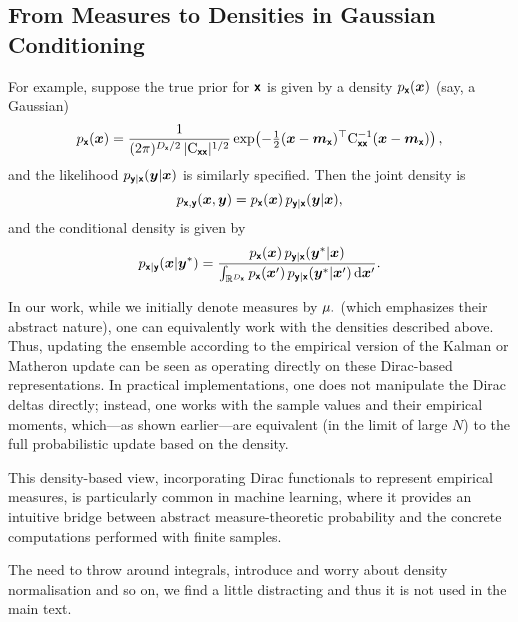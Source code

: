 \documentclass[wcp]{jmlr} %
\begin{document}
\subsection*{From Measures to Densities in Gaussian Conditioning}

For example, suppose the true prior for \(\boldsymbol{\mathsf{x}}\) is given by a density \(p_{\boldsymbol{\mathsf{x}}}(\boldsymbol{x})\) (say, a Gaussian)
\[
    p_{\boldsymbol{\mathsf{x}}}(\boldsymbol{x}) = \frac{1}{(2\pi)^{D_{\boldsymbol{\mathsf{x}}}/2} \,|\mathrm{C}_{\boldsymbol{\mathsf{xx}}}|^{1/2}} \exp\!\left(-\tfrac{1}{2}(\boldsymbol{x}-\boldsymbol{m}_{\boldsymbol{\mathsf{x}}})^\top \mathrm{C}_{\boldsymbol{\mathsf{xx}}}^{-1} (\boldsymbol{x}-\boldsymbol{m}_{\boldsymbol{\mathsf{x}}})\right),
\]
and the likelihood \(p_{\boldsymbol{\mathsf{y}}|\boldsymbol{\mathsf{x}}}(\boldsymbol{y}|\boldsymbol{x})\) is similarly specified. Then the joint density is
\begin{equation}
    p_{\boldsymbol{\mathsf{x}},\boldsymbol{\mathsf{y}}}(\boldsymbol{x},\boldsymbol{y})
    = p_{\boldsymbol{\mathsf{x}}}(\boldsymbol{x})\,p_{\boldsymbol{\mathsf{y}}|\boldsymbol{\mathsf{x}}}(\boldsymbol{y}|\boldsymbol{x}),
\end{equation}
and the conditional density is given by
\begin{equation}
    p_{\boldsymbol{\mathsf{x}}|\boldsymbol{\mathsf{y}}}(\boldsymbol{x}|\boldsymbol{y}^*)
    = \frac{p_{\boldsymbol{\mathsf{x}}}(\boldsymbol{x})\,p_{\boldsymbol{\mathsf{y}}|\boldsymbol{\mathsf{x}}}(\boldsymbol{y}^*|\boldsymbol{x})}{\int_{\mathbb{R}^{D_{\boldsymbol{\mathsf{x}}}}} p_{\boldsymbol{\mathsf{x}}}(\boldsymbol{x}')\,p_{\boldsymbol{\mathsf{y}}|\boldsymbol{\mathsf{x}}}(\boldsymbol{y}^*|\boldsymbol{x}')\,\mathrm{d}\boldsymbol{x}'}.
\end{equation}

In our work, while we initially denote measures by \(\Law[\cdot]\) (which emphasizes their abstract nature), one can equivalently work with the densities described above.
Thus, updating the ensemble according to the empirical version of the Kalman or Matheron update can be seen as operating directly on these Dirac-based representations.
In practical implementations, one does not manipulate the Dirac deltas directly; instead, one works with the sample values and their empirical moments, which—as shown earlier—are equivalent (in the limit of large \(N\)) to the full probabilistic update based on the density.

This density-based view, incorporating Dirac functionals to represent empirical measures, is particularly common in machine learning, where it provides an intuitive bridge between abstract measure-theoretic probability and the concrete computations performed with finite samples.

The need to throw around integrals, introduce and worry about density normalisation and so on, we find a little distracting and thus it is not used in the main text.
\end{document}
